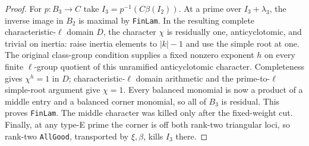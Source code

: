 \begin{proof}
For $p:B_3\to C$ take $I_3=p^{-1}(C\beta(I_2))$.
At a prime over $I_3+\lambda_3$, the inverse image in $B_2$ is
maximal by \texttt{FinLam}.  In the resulting complete
characteristic-$\ell$ domain $D$, the character $\chi$ is
residually one, anticyclotomic, and trivial on inertia:
raise inertia elements to $|k|-1$ and use the simple root at one.
The original class-group condition supplies a fixed nonzero exponent
$h$ on every finite $\ell$-group quotient of this unramified
anticyclotomic character.  Completeness gives $\chi^h=1$ in $D$;
characteristic-$\ell$ domain arithmetic and the prime-to-$\ell$
simple-root argument give $\chi=1$.  Every balanced monomial is
now a product of a middle entry and a balanced corner monomial,
so all of $B_3$ is residual.  This proves \texttt{FinLam}.
The middle character was killed only after the fixed-weight cut.
Finally, at any type-E prime the corner is off both rank-two
triangular loci, so rank-two \texttt{AllGood}, transported by
$\xi,\beta$, kills $I_3$ there.
\end{proof}

